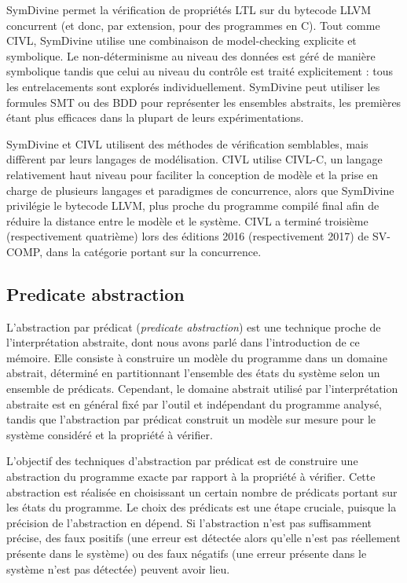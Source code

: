 SymDivine\cite{SymDivine} permet la vérification de propriétés \ac{LTL} sur du
bytecode LLVM concurrent (et donc, par extension, pour des programmes en C).
Tout comme CIVL, SymDivine utilise une combinaison de model-checking explicite
et symbolique. Le non-déterminisme au niveau des données est géré de manière
symbolique tandis que celui au niveau du contrôle est traité explicitement : tous
les entrelacements sont explorés individuellement. SymDivine peut utiliser les
formules SMT ou des \ac{BDD} pour représenter les ensembles abstraits, les premières
étant plus efficaces dans la plupart de leurs expérimentations.

SymDivine et CIVL utilisent des méthodes de vérification semblables, mais
diffèrent par leurs langages de modélisation. CIVL utilise CIVL-C, un langage
relativement haut niveau pour faciliter la conception de modèle et la prise en
charge de plusieurs langages et paradigmes de concurrence, alors que SymDivine
privilégie le bytecode LLVM, plus proche du programme compilé final afin de
réduire la distance entre le modèle et le système. CIVL a terminé troisième
(respectivement quatrième) lors des éditions 2016 (respectivement 2017) de
SV-COMP\cite{svcomp_2016_result, svcomp_2017_result}, dans la catégorie portant
sur la concurrence.

\subsection{Predicate abstraction}

L'abstraction par prédicat (\emph{predicate abstraction}) est une technique
proche de l'interprétation abstraite, dont nous avons parlé dans l'introduction
de ce mémoire. Elle consiste à construire un modèle du programme dans un
domaine abstrait, déterminé en partitionnant l'ensemble des états du système
selon un ensemble de prédicats. Cependant, le domaine abstrait utilisé par
l'interprétation abstraite est en général fixé par l'outil et
indépendant du programme analysé, tandis que l'abstraction par prédicat
construit un modèle sur mesure pour le système considéré et la propriété
à vérifier\cite{abstract_state_graph, dsilva_survey_2008}.

L'objectif des techniques d'abstraction par prédicat est de construire une
abstraction du programme exacte par rapport à la propriété à vérifier. Cette
abstraction est réalisée en choisissant un certain nombre de prédicats portant
sur les états du programme. Le choix des prédicats est une étape cruciale,
puisque la précision de l'abstraction en dépend. Si l'abstraction n'est pas
suffisamment précise, des faux positifs (une erreur est détectée alors qu'elle
n'est pas réellement présente dans le système) ou des faux négatifs (une erreur
présente dans le système n'est pas détectée) peuvent avoir lieu.

